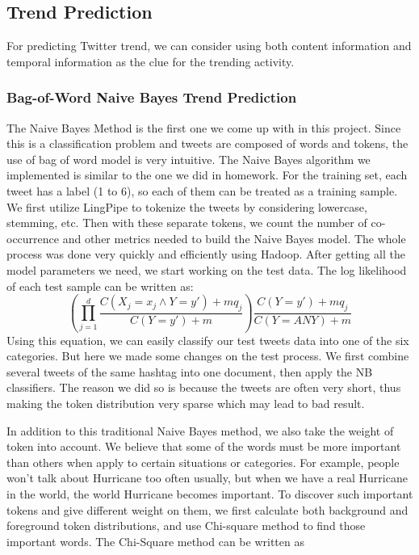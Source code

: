 \documentclass{article}
\begin{document}
\subsection{Trend Prediction}

For predicting Twitter trend, we can consider using both content information and temporal information as the clue for the trending activity.   

\subsubsection{Bag-of-Word Naive Bayes Trend Prediction}
The Naive Bayes Method is the first one we come up with in this project. Since this is a classification problem and tweets are composed of words and tokens, the use of bag of word model is very intuitive. The Naive Bayes algorithm we implemented is similar to the one we did in homework. For the training set, each tweet has a label (1 to 6), so each of them can be treated as a training sample. We first utilize LingPipe to tokenize the tweets by considering lowercase, stemming, etc. Then with these separate tokens, we count the number of co-occurrence and other metrics needed to build the Naive Bayes model. The whole process was done very quickly and efficiently using Hadoop.
After getting all the model parameters we need, we start working on the test data. The log likelihood of each test sample can be written as:
\begin{equation} 
(\prod_{j=1}^d  \frac{C(X_j=x_j \wedge Y=y')+mq_j}{C(Y=y')+m})\frac{C(Y=y')+mq_j}{C(Y=ANY)+m}
\end{equation}
Using this equation, we can easily classify our test tweets data into one of the six categories. But here we made some changes on the test process. We first combine several tweets of the same hashtag into one document, then apply the NB classifiers. The reason we did so is because the tweets are often very short, thus making the token distribution very sparse which may lead to bad result. 

In addition to this traditional Naive Bayes method, we also take the weight of token into account. We believe that some of the words must be more important than others when apply to certain situations or categories. For example, people won't talk about Hurricane too often usually, but when we have a real Hurricane in the world, the world Hurricane becomes important. To discover such important tokens and give different weight on them, we first calculate both background and foreground token distributions, and use Chi-square method to find those important words. The Chi-Square method can be written as
\end{document}
